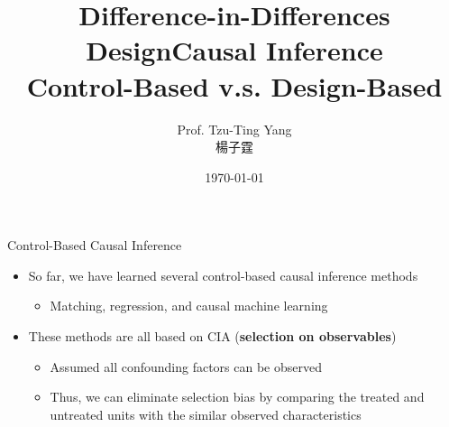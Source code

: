 \documentclass[dvipsnames,hyperref={pdfpagelabels=false}]{beamer}
\title[]  
{Difference-in-Differences Design}
\author 
{Prof. Tzu-Ting Yang  \\ 楊子霆}
\institute{Institute of Economics, Academia Sinica  \\ 中央研究院經濟研究所}
\date
{\today}
\begin{document}
	
	
	\begin{frame}{}
	\titlepage
\end{frame}






\title[]  
{Causal Inference \\ Control-Based  v.s. Design-Based}


\author 
{}

\institute{}






\date
{}


\begin{frame}{}
\titlepage
\end{frame}



\begin{frame}{Control-Based Causal Inference}

\begin{itemize}
\item So far, we have learned several control-based causal inference methods
\vspace{0.2cm}
\begin{itemize}
	\item Matching, regression, and causal machine learning
\end{itemize}
\vspace{0.2cm}
\item These methods are all based on CIA (\textbf{selection on observables}) 
\vspace{0.2cm}
\begin{itemize}
	\item Assumed all confounding factors can be observed
	\vspace{0.2cm}
	\item Thus, we can eliminate selection bias by comparing the treated and untreated units with the similar observed characteristics
\end{itemize}





\end{itemize}

\end{frame}
\end{document}
